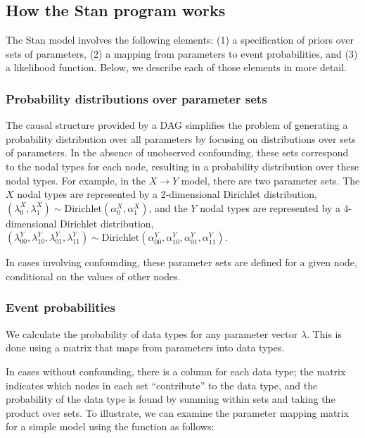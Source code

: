 \documentclass[
  11pt,
  article]{jss}
\renewcommand{\texttt}[1]{\code{#1}}
\begin{document}
\subsection{How the Stan program
works}\label{how-the-stan-program-works}

The Stan model involves the following elements: (1) a specification of
priors over sets of parameters, (2) a mapping from parameters to event
probabilities, and (3) a likelihood function. Below, we describe each of
those elements in more detail.

\subsubsection{Probability distributions over parameter
sets}\label{probability-distributions-over-parameter-sets}

The causal structure provided by a DAG simplifies the problem of
generating a probability distribution over all parameters by focusing on
distributions over sets of parameters. In the absence of unobserved
confounding, these sets correspond to the nodal types for each node,
resulting in a probability distribution over these nodal types. For
example, in the \(X \rightarrow Y\) model, there are two parameter sets.
The \(X\) nodal types are represented by a 2-dimensional Dirichlet
distribution,
\((\lambda^X_0, \lambda^X_1) \sim \text{Dirichlet}(\alpha^X_0, \alpha^X_1)\),
and the \(Y\) nodal types are represented by a \(4\)-dimensional
Dirichlet distribution,
\((\lambda^Y_{00}, \lambda^Y_{10}, \lambda^Y_{01}, \lambda^Y_{11}) \sim \text{Dirichlet}(\alpha^Y_{00}, \alpha^Y_{10}, \alpha^Y_{01}, \alpha^Y_{11})\).

In cases involving confounding, these parameter sets are defined for a
given node, conditional on the values of other nodes.

\subsubsection{Event probabilities}\label{event-probabilities}

We calculate the probability of data types for any parameter vector
\(\lambda\). This is done using a matrix that maps from parameters into
data types.

In cases without confounding, there is a column for each data type; the
matrix indicates which nodes in each set ``contribute'' to the data
type, and the probability of the data type is found by summing within
sets and taking the product over sets. To illustrate, we can examine the
parameter mapping matrix for a simple model using the \texttt{inspect()}
function as follows:
\end{document}
